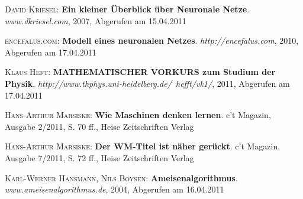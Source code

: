 \begin{thebibliography}{---}

  \textsc{David Kriesel}: 
  \textbf{Ein kleiner Überblick über Neuronale Netze}.
  \emph{www.dkriesel.com}, 2007, Abgerufen am 15.04.2011


  \textsc{encefalus.com}: 
  \textbf{Modell eines neuronalen Netzes}.
  \emph{http://encefalus.com}, 2010, Abgerufen am 17.04.2011
  
  \textsc{Klaus Heft}: 
  \textbf{MATHEMATISCHER VORKURS zum Studium der Physik}.
  \emph{http://www.thphys.uni-heidelberg.de/~hefft/vk1/}, 2011, Abgerufen am 17.04.2011

  \textsc{Hans-Arthur Marsiske}: 
  \textbf{Wie Maschinen denken lernen}.
  c't Magazin, Ausgabe 2/2011, S. 70 ff., Heise Zeitschriften Verlag

  \textsc{Hans-Arthur Marsiske}: 
  \textbf{Der WM-Titel ist näher gerückt}.
  c't Magazin, Ausgabe 7/2011, S. 72 ff., Heise Zeitschriften Verlag

  \textsc{Karl-Werner Hansmann, Nils Boysen}: 
  \textbf{Ameisenalgorithmus}.
  \emph{www.ameisenalgorithmus.de}, 2004, Abgerufen am 16.04.2011


\end{thebibliography}

